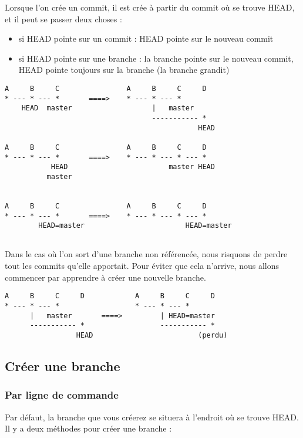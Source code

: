 Lorsque l'on crée un commit, il est crée à partir du commit où se trouve HEAD, et il peut se passer deux choses :\\
\begin{itemize}
\item si HEAD pointe sur un commit : HEAD pointe sur le nouveau commit
\item si HEAD pointe sur une branche : la branche pointe sur le nouveau commit, HEAD pointe toujours sur la branche (la branche grandit)\\
\end{itemize}

\begin{verbatim}
A     B     C                A     B     C     D
* --- * --- *       ====>    * --- * --- *
    HEAD  master                   |   master
                                   ----------- *
                                              HEAD
          
A     B     C                A     B     C     D
* --- * --- *       ====>    * --- * --- * --- *
           HEAD                        master HEAD
          master                          
          
          
A     B     C                A     B     C     D
* --- * --- *       ====>    * --- * --- * --- *
        HEAD=master                        HEAD=master
        
\end{verbatim}

Dans le cas où l'on sort d'une branche non référencée, nous risquons de perdre tout les commits qu'elle apportait.
Pour éviter que cela n'arrive, nous allons commencer par apprendre à créer une nouvelle branche.

\begin{verbatim}
A     B     C     D            A     B     C     D
* --- * --- *                  * --- * --- *
      |   master       ====>         | HEAD=master
      ----------- *                  ----------- *
                 HEAD                         (perdu)
\end{verbatim}
\newpage
\subsection{Créer une branche}
\subsubsection{Par ligne de commande}

Par défaut, la branche que vous créerez se situera à l'endroit où se trouve HEAD.
Il y a deux méthodes pour créer une branche :

